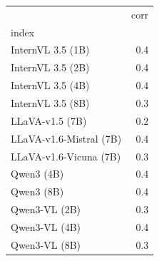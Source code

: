 \begin{tabular}{lr}
\toprule
 & corr \\
index &  \\
\midrule
InternVL 3.5 (1B) & 0.4 \\
InternVL 3.5 (2B) & 0.4 \\
InternVL 3.5 (4B) & 0.4 \\
InternVL 3.5 (8B) & 0.3 \\
LLaVA-v1.5 (7B) & 0.2 \\
LLaVA-v1.6-Mistral (7B) & 0.4 \\
LLaVA-v1.6-Vicuna (7B) & 0.3 \\
Qwen3 (4B) & 0.4 \\
Qwen3 (8B) & 0.4 \\
Qwen3-VL (2B) & 0.3 \\
Qwen3-VL (4B) & 0.4 \\
Qwen3-VL (8B) & 0.3 \\
\bottomrule
\end{tabular}
